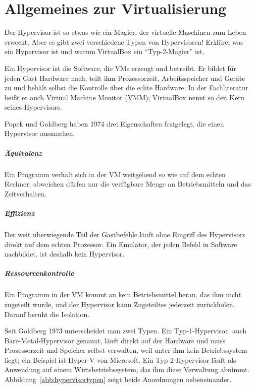\chapter{Allgemeines zur Virtualisierung}
\label{kap:allgemeines}

\begin{aufgabe}
Der Hypervisor ist so etwas wie ein Magier, der virtuelle Maschinen zum Leben erweckt. Aber es gibt zwei verschiedene Typen von Hypervisoren! Erkläre, was ein Hypervisor ist und warum VirtualBox ein \enquote{Typ-2-Magier} ist.
\end{aufgabe}
\label{sec:hypervisor}

Ein Hypervisor ist die Software, die VMs erzeugt und betreibt. Er bildet für jeden Gast Hardware nach, teilt ihm Prozessorzeit, Arbeitsspeicher und Geräte zu und behält selbst die Kontrolle über die echte Hardware. In der Fachliteratur heißt er auch Virtual Machine Monitor (VMM); VirtualBox nennt so den Kern seines Hypervisors.

Popek und Goldberg haben 1974 drei Eigenschaften festgelegt, die einen Hypervisor ausmachen.

\paragraph{Äquivalenz} Ein Programm verhält sich in der VM weitgehend so wie auf dem echten Rechner; abweichen dürfen nur die verfügbare Menge an Betriebsmitteln und das Zeitverhalten.

\paragraph{Effizienz} Der weit überwiegende Teil der Gastbefehle läuft ohne Eingriff des Hypervisors direkt auf dem echten Prozessor. Ein Emulator, der jeden Befehl in Software nachbildet, ist deshalb kein Hypervisor.

\paragraph{Ressourcenkontrolle} Ein Programm in der VM kommt an kein Betriebsmittel heran, das ihm nicht zugeteilt wurde, und der Hypervisor kann Zugeteiltes jederzeit zurückholen. Darauf beruht die Isolation.

Seit Goldberg 1973 unterscheidet man zwei Typen. Ein Typ-1-Hypervisor, auch Bare-Metal-Hypervisor genannt, läuft direkt auf der Hardware und muss Prozessorzeit und Speicher selbst verwalten, weil unter ihm kein Betriebssystem liegt; ein Beispiel ist Hyper-V von Microsoft. Ein Typ-2-Hypervisor läuft als Anwendung auf einem Wirtsbetriebssystem, das ihm diese Verwaltung abnimmt. Abbildung~\ref{abb:hypervisortypen} zeigt beide Anordnungen nebeneinander.

